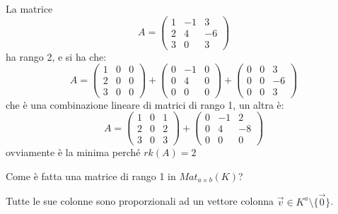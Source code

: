 \documentclass[../main.tex]{subfiles}
\begin{document}
\begin{example}
    La matrice
    \begin{equation*}
        A = \begin{pmatrix}
            1 & -1 & 3  \\
            2 & 4  & -6 \\
            3 & 0  & 3
        \end{pmatrix}
    \end{equation*}
    ha rango 2, e si ha che:
    \begin{equation*}
        A = \begin{pmatrix}
            1 & 0 & 0 \\
            2 & 0 & 0 \\
            3 & 0 & 0
        \end{pmatrix} + \begin{pmatrix}
            0 & -1 & 0 \\
            0 & 4  & 0 \\
            0 & 0  & 0
        \end{pmatrix} + \begin{pmatrix}
            0 & 0 & 3  \\
            0 & 0 & -6 \\
            0 & 0 & 3
        \end{pmatrix}
    \end{equation*}
    che è una combinazione lineare di matrici di rango 1, un altra è:
    \begin{equation*}
        A = \begin{pmatrix}
            1 & 0 & 1 \\
            2 & 0 & 2 \\
            3 & 0 & 3
        \end{pmatrix} + \begin{pmatrix}
            0 & -1 & 2  \\
            0 & 4  & -8 \\
            0 & 0  & 0
        \end{pmatrix}
    \end{equation*}
    ovviamente è la minima perché $rk(A) = 2$
\end{example}

Come è fatta una matrice di rango 1 in $Mat_{a \times b}(K)$?

Tutte le sue colonne sono proporzionali ad un vettore colonna $\overrightarrow{v} \in K^a \setminus \{\overrightarrow{0}\}$.
\end{document}

